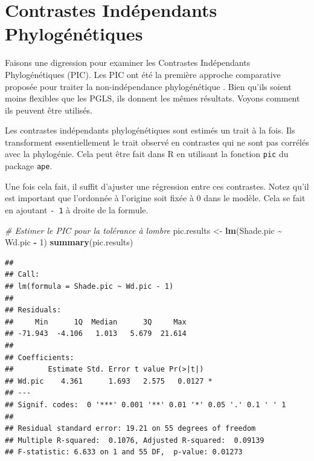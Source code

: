\documentclass[
]{book}
\newenvironment{Shaded}{\begin{snugshade}}{\end{snugshade}}
\newcommand{\AttributeTok}[1]{\textcolor[rgb]{0.13,0.29,0.53}{#1}}
\newcommand{\CommentTok}[1]{\textcolor[rgb]{0.56,0.35,0.01}{\textit{#1}}}
\newcommand{\DecValTok}[1]{\textcolor[rgb]{0.00,0.00,0.81}{#1}}
\newcommand{\FunctionTok}[1]{\textcolor[rgb]{0.13,0.29,0.53}{\textbf{#1}}}
\newcommand{\NormalTok}[1]{#1}
\newcommand{\OtherTok}[1]{\textcolor[rgb]{0.56,0.35,0.01}{#1}}
\newcommand{\SpecialCharTok}[1]{\textcolor[rgb]{0.81,0.36,0.00}{\textbf{#1}}}
\begin{document}
\chapter{Contrastes Indépendants Phylogénétiques}\label{pic}

Faisons une digression pour examiner les Contrastes Indépendants Phylogénétiques (PIC). Les PIC ont été la première approche comparative proposée pour traiter la non-indépendance phylogénétique \citep{felsenstein1985phylogenies}. Bien qu'ils soient moins flexibles que les PGLS, ils donnent les mêmes résultats. Voyons comment ils peuvent être utilisés.

Les contrastes indépendants phylogénétiques sont estimés un trait à la fois. Ils transforment essentiellement le trait observé en contrastes qui ne sont pas corrélés avec la phylogénie. Cela peut être fait dans R en utilisant la fonction \texttt{pic} du package \texttt{ape}.

\begin{Shaded}
\end{Shaded}

Une fois cela fait, il suffit d'ajuster une régression entre ces contrastes. Notez qu'il est important que l'ordonnée à l'origine soit fixée à 0 dans le modèle. Cela se fait en ajoutant \texttt{-\ 1} à droite de la formule.

\begin{Shaded}
\begin{Highlighting}[]
\CommentTok{\# Estimer le PIC pour la tolérance à l\textquotesingle{}ombre }
\NormalTok{pic.results }\OtherTok{\textless{}{-}} \FunctionTok{lm}\NormalTok{(Shade.pic }\SpecialCharTok{\textasciitilde{}}\NormalTok{ Wd.pic }\SpecialCharTok{{-}} \DecValTok{1}\NormalTok{)}
\FunctionTok{summary}\NormalTok{(pic.results)}
\end{Highlighting}
\end{Shaded}

\begin{verbatim}
## 
## Call:
## lm(formula = Shade.pic ~ Wd.pic - 1)
## 
## Residuals:
##     Min      1Q  Median      3Q     Max 
## -71.943  -4.106   1.013   5.679  21.614 
## 
## Coefficients:
##        Estimate Std. Error t value Pr(>|t|)  
## Wd.pic    4.361      1.693   2.575   0.0127 *
## ---
## Signif. codes:  0 '***' 0.001 '**' 0.01 '*' 0.05 '.' 0.1 ' ' 1
## 
## Residual standard error: 19.21 on 55 degrees of freedom
## Multiple R-squared:  0.1076, Adjusted R-squared:  0.09139 
## F-statistic: 6.633 on 1 and 55 DF,  p-value: 0.01273
\end{verbatim}
\end{document}
